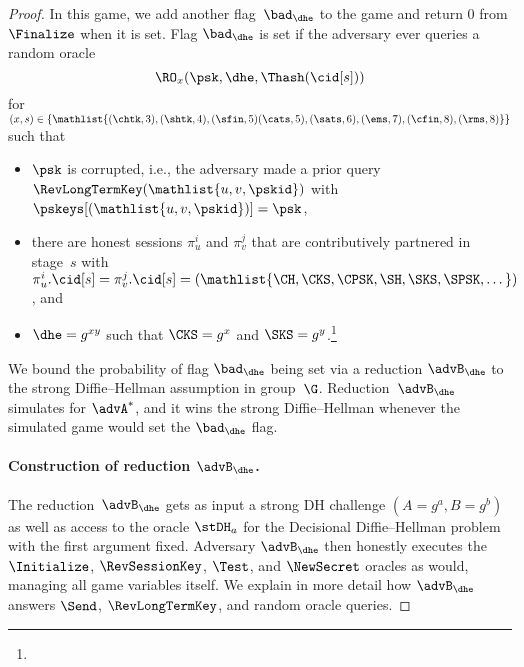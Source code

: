 \begin{proof}
		
	In this game, we add another flag~$\bad_\dhe$ to the game and return $0$ from $\Finalize$ when it is set.
	Flag $\bad_\dhe$ is set if the adversary ever queries a random oracle
	\[
		\RO_x(\psk, \dhe, \Thash(\cid[s]))
	\]
	for $(x,s) \in \{\mathlist{(\chtk,3), (\shtk,4), (\sfin, 5) (\cats,5), (\sats,6), (\ems,7), (\cfin, 8), (\rms,8)}\}$ such that
	\begin{itemize}
		\item $\psk$ is corrupted, i.e., the adversary made a prior query $\RevLongTermKey(\mathlist{u,v,\pskid})$ with $\pskeys[(\mathlist{u,v,\pskid})] = \psk$,
		\item there are honest sessions $\pi_u^i$ and $\pi_v^j$ that are contributively partnered in stage~$s$ with $\pi_u^i.\cid[s] = \pi_v^j.\cid[s] = (\mathlist{\CH, \CKS, \CPSK, \SH, \SKS, \SPSK,\dotsc})$, and
		\item $\dhe = g^{xy}$ such that $\CKS = g^x$ and $\SKS = g^y$.\footnote{}
	\end{itemize}


	We bound the probability of flag $\bad_\dhe$ being set via a reduction $\advB_\dhe$ to the strong Diffie--Hellman assumption in group~$\G$.
	Reduction~$\advB_\dhe$ simulates \thisGame for $\advA^*$, and it wins the strong Diffie--Hellman whenever the simulated game would set the $\bad_{\dhe}$ flag.
	
	\paragraph{Construction of reduction $\advB_\dhe$.}
	The reduction~$\advB_\dhe$ gets as input a strong DH challenge $(A = g^a, B = g^b)$ as well as access to the oracle $\stDH_a$ for the Decisional Diffie--Hellman problem with the first argument fixed. 
	Adversary $\advB_\dhe$ then honestly executes the $\Initialize$, $\RevSessionKey$, $\Test$, and $\NewSecret$ oracles as \thisGame would, managing all game variables itself.
	We explain in more detail how $\advB_\dhe$ answers $\Send$, $\RevLongTermKey$, and random oracle queries. 
	

\end{proof}
